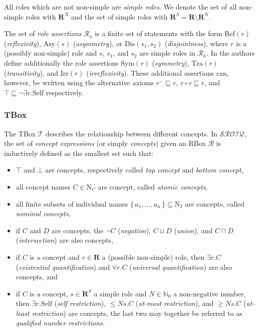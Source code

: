All roles which are not non-simple are \emph{simple roles}. We denote the set of all non-simple roles with $\mathbf{R}^N$ and the set of simple roles with $\mathbf{R}^S = \mathbf{R} \setminus \mathbf{R}^N$.

The set of \emph{role assertions} $\mathcal{R}_a$ is a finite set of statements with the form $\mathrm{Ref}(r)$ (\emph{reflexivity}), $\mathrm{Asy}(s)$ (\emph{asymmetry}), or $\mathrm{Dis}(s_1, s_2)$ (\emph{disjointness}), where $r$ is a (possibly non-simple) role and $s$, $s_1$, and $s_2$ are simple roles in $\mathcal{R}_h$. In \cite{horrocks2006even} the authors define additionally the role assertions $\mathrm{Sym}(r)$ (\emph{symmetry}), $\mathrm{Tra}(r)$ (\emph{transitivity}), and $\mathrm{Irr}(r)$ (\emph{irreflexivity}). These additional assertions can, however, be written using the alternative axioms $r^- \sqsubseteq r$, $r \circ r \sqsubseteq r$, and $\top \sqsubseteq \lnot \exists r . \mathrm{Self}$ respectively.

\subsubsection{TBox}

The TBox $\mathcal{T}$ describes the relationship between different concepts. In $\mathcal{SROIQ}$, the set of \emph{concept expressions} (or simply \emph{concepts}) given an RBox $\mathcal{R}$ is inductively defined as the smallest set such that:

\begin{itemize}
    \item $\top$ and $\bot$ are concepts, respectively called \emph{top concept} and \emph{bottom concept},
    \item all concept names $C \in \mathrm{N}_C$ are concept, called \emph{atomic concepts},
    \item all finite subsets of individual names $\{ \, a_1, \dots, a_n \, \} \subseteq \mathrm{N}_I$ are concepts, called \emph{nominal concepts,}
    \item if $C$ and $D$ are concepts, the $\lnot C$ (\emph{negation}), $C \sqcup D$ (\emph{union}), and $C \sqcap D$ (\emph{intersection}) are also concepts,
    \item if $C$ is a concept and $r \in \mathbf{R}$ a (possible non-simple) role, then $\exists r . C$ (\emph{existential quantification}) and $\forall r . C$ (\emph{universal quantification}) are also concepts, and
    \item if $C$ is a concept, $s \in \mathbf{R}^S$ a simple role and $N \in \mathbb{N}_0$ a non-negative number, then $\exists r . \mathrm{Self}$ (\emph{self restriction}), $\leq N s . C$ (\emph{at-most restriction}), and $\geq N s. C$ (\emph{at-least restriction}) are concepts, the last two may together be referred to as \emph{qualified number restrictions.}
\end{itemize}

